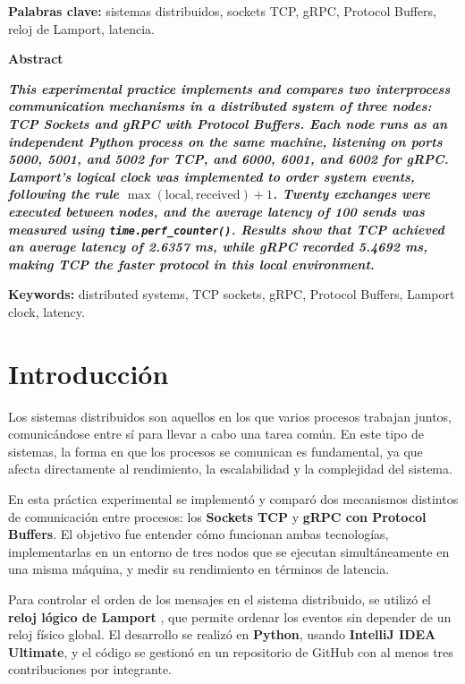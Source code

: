 \documentclass[12pt,a4paper]{article}
\begin{document}
\vspace{0.5cm}
\noindent\textbf{Palabras clave:} sistemas distribuidos, sockets TCP, gRPC, Protocol Buffers, reloj de Lamport, latencia.

\vspace{1cm}

\begin{center}
    {\large \textbf{Abstract}}
\end{center}

\textbf{\textit{This experimental practice implements and compares two interprocess communication mechanisms in a distributed system of three nodes: TCP Sockets and gRPC with Protocol Buffers. Each node runs as an independent Python process on the same machine, listening on ports 5000, 5001, and 5002 for TCP, and 6000, 6001, and 6002 for gRPC. Lamport's logical clock was implemented to order system events, following the rule \(\max(\text{local}, \text{received}) + 1\). Twenty exchanges were executed between nodes, and the average latency of 100 sends was measured using \texttt{time.perf\_counter()}. Results show that TCP achieved an average latency of 2.6357 ms, while gRPC recorded 5.4692 ms, making TCP the faster protocol in this local environment.}}

\vspace{0.5cm}
\noindent\textbf{Keywords:} distributed systems, TCP sockets, gRPC, Protocol Buffers, Lamport clock, latency.

\newpage
\tableofcontents
\newpage

\section{Introducción}

Los sistemas distribuidos son aquellos en los que varios procesos trabajan juntos, comunicándose entre sí para llevar a cabo una tarea común. En este tipo de sistemas, la forma en que los procesos se comunican es fundamental, ya que afecta directamente al rendimiento, la escalabilidad y la complejidad del sistema.

En esta práctica experimental se implementó y comparó dos mecanismos distintos de comunicación entre procesos: los \textbf{Sockets TCP} y \textbf{gRPC con Protocol Buffers}. El objetivo fue entender cómo funcionan ambas tecnologías, implementarlas en un entorno de tres nodos que se ejecutan simultáneamente en una misma máquina, y medir su rendimiento en términos de latencia.

Para controlar el orden de los mensajes en el sistema distribuido, se utilizó el \textbf{reloj lógico de Lamport} \cite{lamport1978}, que permite ordenar los eventos sin depender de un reloj físico global. El desarrollo se realizó en \textbf{Python}, usando \textbf{IntelliJ IDEA Ultimate}, y el código se gestionó en un repositorio de GitHub con al menos tres contribuciones por integrante.
\end{document}
